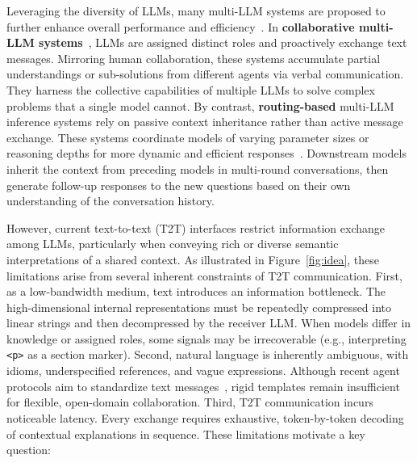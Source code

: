 Leveraging the diversity of LLMs, many multi-LLM systems are proposed to further enhance overall performance and efficiency~\citep{guo2024agentsSurvey, tran2025collabSurvey}. 
In \textbf{collaborative multi-LLM systems}~\citep{li2023camel, wu2023autogen}, LLMs are assigned distinct roles and proactively exchange text messages.
Mirroring human collaboration, these systems accumulate partial understandings or sub-solutions from different agents via verbal communication. They harness the collective capabilities of multiple LLMs to solve complex problems that a single model cannot.
By contrast, \textbf{routing-based} multi-LLM inference systems rely on passive context inheritance rather than active message exchange.
These systems coordinate models of varying parameter sizes or reasoning depths for more dynamic and efficient responses~\citep{li2024eagle, fu2025r2r, ong2024routellm, OpenAI2025GPT5}.
Downstream models inherit the context from preceding models in multi-round conversations, then generate follow-up responses to the new questions based on their own understanding of the conversation history.

However, current text-to-text (T2T) interfaces restrict information exchange among LLMs, particularly when conveying rich or diverse semantic interpretations of a shared context. 
As illustrated in Figure~\ref{fig:idea}, these limitations arise from several inherent constraints of T2T communication.
First, as a low-bandwidth medium, text introduces an information bottleneck. The high-dimensional internal representations must be repeatedly compressed into linear strings and then decompressed by the receiver LLM. 
When models differ in knowledge or assigned roles, some signals may be irrecoverable (e.g., interpreting \texttt{<p>} as a section marker).
Second, natural language is inherently ambiguous, with idioms, underspecified references, and vague expressions. 
Although recent agent protocols aim to standardize text messages~\citep{anthropic2024mcp, google2025a2a}, rigid templates remain insufficient for flexible, open-domain collaboration.
Third, T2T communication incurs noticeable latency. 
Every exchange requires exhaustive, token-by-token decoding of contextual explanations in sequence.
These limitations motivate a key question:

